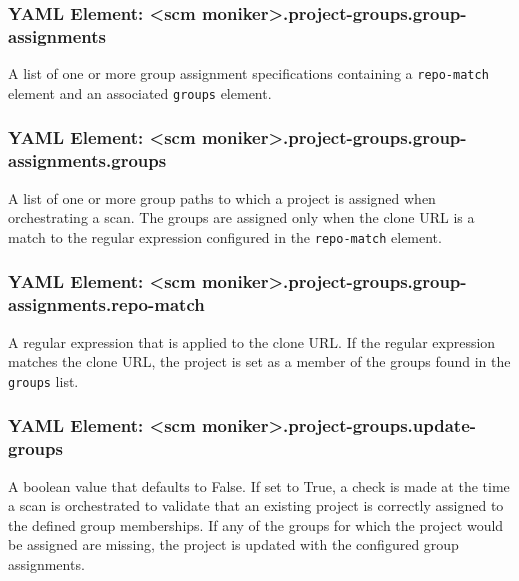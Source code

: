 \subsubsection{YAML Element: <scm moniker>.project-groups.group-assignments}\label{sec:yaml-project-groups-group-assignments}
A list of one or more group assignment specifications containing a \texttt{repo-match} element and an associated \texttt{groups}
element.

\subsubsection{YAML Element: <scm moniker>.project-groups.group-assignments.groups}\label{sec:yaml-project-groups-group-assignments-groups}
A list of one or more group paths to which a project is assigned when orchestrating a scan.  The groups are assigned only when the
clone URL is a match to the regular expression configured in the \texttt{repo-match} element.

\subsubsection{YAML Element: <scm moniker>.project-groups.group-assignments.repo-match}\label{sec:yaml-project-groups-group-assignments-repo-match}
A regular expression that is applied to the clone URL.  If the regular expression matches the clone URL, the project is set as a
member of the groups found in the \texttt{groups} list.

\subsubsection{YAML Element: <scm moniker>.project-groups.update-groups}\label{sec:yaml-project-groups-update-groups}

A boolean value that defaults to False.  If set to True, a check is made at the time a scan is orchestrated to validate that
an existing \cxone project is correctly assigned to the defined group memberships.  If any of the groups for which the project
would be assigned are missing, the project is updated with the configured group assignments.

